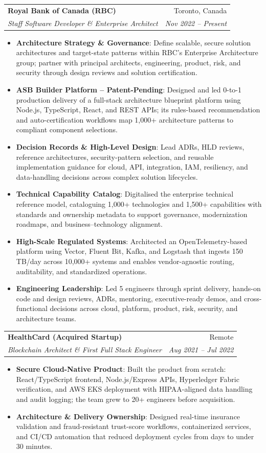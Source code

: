\documentclass[letterpaper,9.5pt]{article}
\makeatletter
\newcommand{\resumeItem}[2]{\item\small{\textbf{#1}{: #2 \vspace{-2pt}}}}
\newcommand{\resumeSubheading}[4]{\vspace{-2pt}\item\begin{tabular*}{0.97\textwidth}{l@{\extracolsep{\fill}}r}\textbf{#1} & #2 \\\textit{\small#3} & \textit{\small #4} \\\end{tabular*}\vspace{-6pt}}
\newcommand{\resumeItemListStart}{\begin{itemize}}
\newcommand{\resumeItemListEnd}{\end{itemize}\vspace{-6pt}}
\makeatother
\begin{document}
  \resumeSubheading
    {Royal Bank of Canada (RBC)}{Toronto, Canada}
    {Staff Software Developer \& Enterprise Architect}{Nov 2022 -- Present}
  \resumeItemListStart
    \resumeItem{Architecture Strategy \& Governance}
      {Define scalable, secure solution architectures and target-state patterns within RBC's Enterprise Architecture group; partner with principal architects, engineering, product, risk, and security through design reviews and solution certification.}
    \resumeItem{ASB Builder Platform -- Patent-Pending}
      {Designed and led 0-to-1 production delivery of a full-stack architecture blueprint platform using Node.js, TypeScript, React, and REST APIs; its rules-based recommendation and auto-certification workflows map 1,000+ architecture patterns to compliant component selections.}
    \resumeItem{Decision Records \& High-Level Design}
      {Lead ADRs, HLD reviews, reference architectures, security-pattern selection, and reusable implementation guidance for cloud, API, integration, IAM, resiliency, and data-handling decisions across complex solution lifecycles.}
    \resumeItem{Technical Capability Catalog}
      {Digitalised the enterprise technical reference model, cataloguing 1,000+ technologies and 1,500+ capabilities with standards and ownership metadata to support governance, modernization roadmaps, and business--technology alignment.}
    \resumeItem{High-Scale Regulated Systems}
      {Architected an OpenTelemetry-based platform using Vector, Fluent Bit, Kafka, and Logstash that ingests 150\,TB/day across 10,000+ systems and enables vendor-agnostic routing, auditability, and standardized operations.}
    \resumeItem{Engineering Leadership}
      {Led 5 engineers through sprint delivery, hands-on code and design reviews, ADRs, mentoring, executive-ready demos, and cross-functional decisions across cloud, platform, product, risk, security, and architecture teams.}
  \resumeItemListEnd

  \resumeSubheading
    {HealthCard (Acquired Startup)}{Remote}
    {Blockchain Architect \& First Full Stack Engineer}{Aug 2021 -- Jul 2022}
  \resumeItemListStart
    \resumeItem{Secure Cloud-Native Product}
      {Built the product from scratch: React/TypeScript frontend, Node.js/Express APIs, Hyperledger Fabric verification, and AWS EKS deployment with HIPAA-aligned data handling and audit logging; the team grew to 20+ engineers before acquisition.}
    \resumeItem{Architecture \& Delivery Ownership}
      {Designed real-time insurance validation and fraud-resistant trust-score workflows, containerized services, and CI/CD automation that reduced deployment cycles from days to under 30 minutes.}
  \resumeItemListEnd
\end{document}
